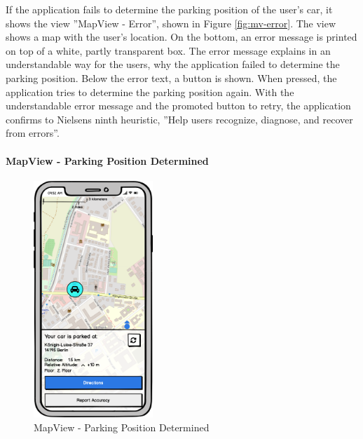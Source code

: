 If the application fails to determine the parking position of the user's car, it shows the view ''MapView - Error'', shown in Figure \ref{fig:mv-error}. The view shows a map with the user's location. On the bottom, an error message is printed on top of a white, partly transparent box. The error message explains in an understandable way for the users, why the application failed to determine the parking position. Below the error text, a button is shown. When pressed, the application tries to determine the parking position again. With the understandable error message and the promoted button to retry, the application confirms to Nielsens ninth heuristic, ''Help users recognize, diagnose, and recover from errors''. \cite{nielsen1994usability}

\paragraph{MapView - Parking Position Determined}

\begin{figure}[h]
    \centering
    \includegraphics[width=0.4\textwidth]{images/UI/Iteration4-MapView-ParkingPositionDetermined.png}
    \caption{MapView - Parking Position Determined}
    \label{fig:mv-parking}
\end{figure}

